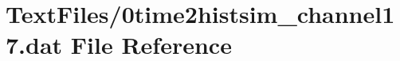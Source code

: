 \hypertarget{0time2histsim__channel17_8dat}{}\section{Text\+Files/0time2histsim\+\_\+channel17.dat File Reference}
\label{0time2histsim__channel17_8dat}
